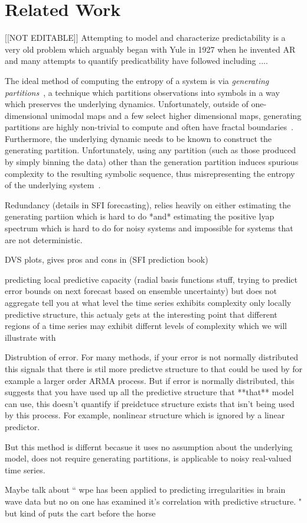 \section{Related Work }\label{sec:related}
{\color{red}[[NOT EDITABLE]]}
Attempting to model and characterize predictability is a very old problem which arguably began with Yule in 1927 when he invented AR and many attempts to quantify predicatbility have followed including ....

The ideal method of computing the entropy of a system is via \emph{generating partitions}~\cite{lind95}, a technique which partitions observations into symbols in a way which preserves the underlying dynamics. Unfortunately, outside of one-dimensional unimodal maps and a few select higher dimensional maps, generating partitions are highly non-trivial to compute and often have fractal boundaries~\cite{eisele1999}. Furthermore, the underlying dynamic needs to be known to construct the generating partition. Unfortunately, using any partition (such as those produced by simply binning the data) other than the generation partition induces spurious complexity to the resulting symbolic sequence, thus misrepresenting the entropy of the underlying system~\cite{bollt2001}.


Redundancy (details in SFI forecasting), relies heavily on either estimating the generating partiion which is hard to do *and* estimating the positive lyap spectrum which is hard to do for noisy systems and impossible for systems that are not deterministic.

DVS plots, gives pros and cons in (SFI prediction book)

predicting local predictive capacity (radial basis functions stuff, trying to predict error bounds on next forecast based on ensemble uncertainty) but does not aggregate tell you at what level the time series exhibits complexity only locally predictive structure, this actualy gets at the interesting point that different regions of a time series may exhibit differnt levels of complexity which we will illustrate with \svd

Distrubtion of error. For many methods, if your error is not normally distributed this signals that there is stil more predictve structure to that could be used by for example a larger order ARMA process. But if error is normally distributed, this suggests that you have used up all the predictive structure that **that** model can use, this doesn't quantify if preidctuce structure exists that isn't being used by this process. For example, nonlinear structure which is ignored by a linear predictor.


But this method is differnt becasue it uses no assumption about the underlying model, does not require generating partitions, is applicable to noisy real-valued time series.


Maybe talk about ``
wpe has been applied to predicting irregularities in brain wave data but no on one has examined it's correlation with predictive structure. "
but kind of puts the cart before the horse


